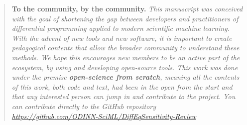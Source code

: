 
\begin{quote}
    \textbf{To the community, by the community.}
    \textit{This manuscript was conceived with the goal of shortening the gap between developers and practitioners of differential programming applied to  modern scientific machine learning. 
    With the advent of new tools and new software, it is important to create pedagogical contents that allow the broader community to understand these methods. 
    We hope this encourages new members to be an active part of the ecosystem, by using and developing open-source tools. 
    This work was done under the premise \textbf{open-science from scratch}, meaning all the contents of this work, both code and text, had been in the open from the start and that any interested person can jump in and contribute to the project. 
    You can contribute directly to the GitHub repository \url{https://github.com/ODINN-SciML/DiffEqSensitivity-Review}
    }
\end{quote}